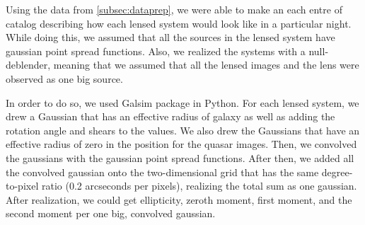 \documentclass[\docopts]{\docclass}
\begin{document}
Using the data from \ref{subsec:dataprep}, we were able to make an each entre of catalog describing how each lensed system would look like in a particular night. While doing this, we assumed that all the sources in the lensed system have gaussian point spread functions. Also, we realized the systems with a null-deblender, meaning that we assumed that all the lensed images and the lens were observed as one big source.

In order to do so, we used Galsim package in Python. For each lensed system, we drew a Gaussian that has an effective radius of galaxy as well as adding the rotation angle and shears to the values. We also drew the Gaussians that have an effective radius of zero in the position for the quasar images. Then, we convolved the gaussians with the gaussian point spread functions. After then, we added all the convolved gaussian onto the two-dimensional grid that has the same degree-to-pixel ratio (0.2 arcseconds per pixels), realizing the total sum as one gaussian. After realization, we could get ellipticity, zeroth moment, first moment, and the second moment per one big, convolved gaussian.
\end{document}
